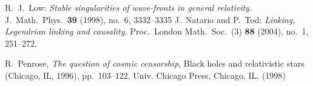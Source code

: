 \documentclass[12pt,reqno,a4paper]{amsart}
\begin{document}
\begin{thebibliography}{99}
R.~J.~Low: {\em Stable singularities of wave-fronts in general relativity.\/} J.~Math.~Phys.~{\bf 39} (1998), no.~6, 3332--3335
J.~Natario and P.~Tod: {\em Linking, Legendrian linking and
causality.\/} Proc.~London Math.~Soc.~(3) {\bf 88} (2004), no.~1,
251--272.

R.~Penrose, {\it The question of cosmic censorship},
Black holes and relativistic stars (Chicago, IL, 1996), pp.~103--122, 
Univ. Chicago Press, Chicago, IL, (1998)

\end{thebibliography}
\end{document}
